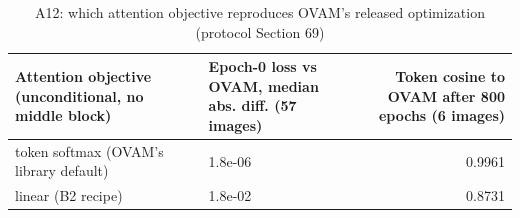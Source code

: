 \begin{table}[H]\centering\scriptsize\setlength{\tabcolsep}{3pt}
\begin{tabular}{>{\raggedright\arraybackslash}p{3.33cm}>{\raggedright\arraybackslash}p{3.28cm}r}
\toprule
Attention objective (unconditional, no middle block) & Epoch-0 loss vs OVAM, median abs. diff. (57 images) & Token cosine to OVAM after 800 epochs (6 images) \\
\midrule
token softmax (OVAM's library default) & 1.8e-06 & 0.9961 \\
linear (B2 recipe) & 1.8e-02 & 0.8731 \\
\bottomrule
\end{tabular}
\caption{A12: which attention objective reproduces OVAM's released optimization (protocol Section 69)}\label{tab:a12_recipe_audit}
\end{table}
